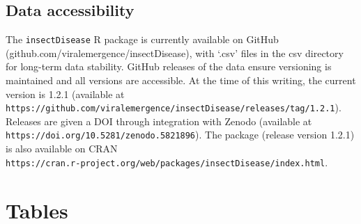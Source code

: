 \documentclass[12pt]{article}
\begin{document}
\subsection*{Data accessibility}
The \texttt{insectDisease} R package is currently available on GitHub \\ (github.com/viralemergence/insectDisease), with `.csv' files in the csv directory for long-term data stability. GitHub releases of the data ensure versioning is maintained and all versions are accessible. At the time of this writing, the current version is 1.2.1 (available at \\ \texttt{https://github.com/viralemergence/insectDisease/releases/tag/1.2.1}). \\
Releases are given a DOI through integration with Zenodo (available at \\ \texttt{https://doi.org/10.5281/zenodo.5821896}). The package (release version 1.2.1) is also available on CRAN \\ \texttt{https://cran.r-project.org/web/packages/insectDisease/index.html}. 
 















\clearpage


\clearpage


























\clearpage


\section*{Tables}
\end{document}
